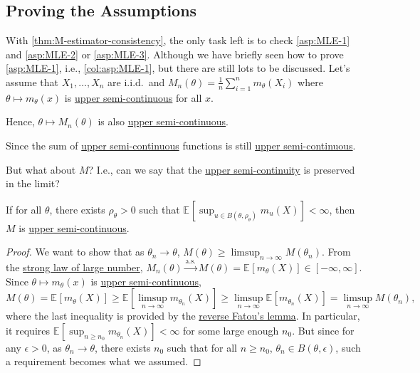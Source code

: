 \subsection{Proving the Assumptions}
With \autoref{thm:M-estimator-consistency}, the only task left is to check \autoref{asp:MLE-1} and \autoref{asp:MLE-2} or \autoref{asp:MLE-3}. Although we have briefly seen how to prove \autoref{asp:MLE-1}, i.e., \autoref{col:asp:MLE-1}, but there are still lots to be discussed. Let's assume that \(X_1, \dots , X_n\) are i.i.d.\ and \(M_n(\theta ) = \frac{1}{n}\sum_{i=1}^{n} m_\theta (X_i)\) where \(\theta \mapsto m_\theta (x)\) is \hyperref[def:upper-semi-continuous]{upper semi-continuous} for all \(x\).

\begin{note}
	Hence, \(\theta \mapsto M_n(\theta )\) is also \hyperref[def:upper-semi-continuous]{upper semi-continuous}.
\end{note}
\begin{explanation}
	Since the sum of \hyperref[def:upper-semi-continuous]{upper semi-continuous} functions is still \hyperref[def:upper-semi-continuous]{upper semi-continuous}.
\end{explanation}

But what about \(M\)? I.e., can we say that the \hyperref[def:upper-semi-continuous]{upper semi-continuity} is preserved in the limit?

\begin{proposition}\label{prop:M-estimator-upper-semi-continuous}
	If for all \(\theta \), there exists \(\rho _\theta > 0\) such that \(\mathbb{E}_{}[\sup _{u \in B(\theta , \rho _\theta )} m_u(X)] < \infty \), then \(M\) is \hyperref[def:upper-semi-continuous]{upper semi-continuous}.
\end{proposition}
\begin{proof}
	We want to show that as \(\theta _n \to \theta \), \(M(\theta ) \geq \limsup_{n \to \infty} M(\theta _n)\). From the \hyperref[thm:SLLN]{strong law of large number}, \(M_n(\theta ) \overset{\text{a.s.} }{\to} M(\theta ) = \mathbb{E}_{}[m_\theta (X)] \in [-\infty , \infty ]\). Since \(\theta \mapsto m_\theta (x)\) is \hyperref[def:upper-semi-continuous]{upper semi-continuous},
	\[
		M(\theta )
		= \mathbb{E}_{}[m_\theta (X)]
		\geq \mathbb{E}_{}\left[\limsup_{n \to \infty} m_{\theta _n}(X)\right]
		\geq \limsup_{n \to \infty} \mathbb{E}_{}[m_{\theta _n}(X)]
		= \limsup_{n \to \infty} M(\theta _n),
	\]
	where the last inequality is provided by the \href{https://en.wikipedia.org/wiki/Fatou%27s_lemma#Reverse_Fatou_lemma}{reverse Fatou's lemma}. In particular, it requires \(\mathbb{E}_{}[\sup _{n \geq n_0} m_{\theta _n}(X)] < \infty \) for some large enough \(n_0\). But since for any \(\epsilon > 0\), as \(\theta _n \to \theta \), there exists \(n_0\) such that for all \(n \geq n_0\), \(\theta _n \in B(\theta , \epsilon )\), such a requirement becomes what we assumed.
\end{proof}

